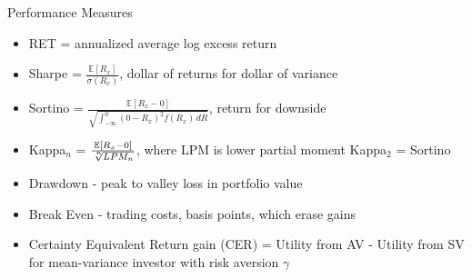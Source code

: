 \documentclass{beamer}
\begin{document}
\begin{frame}{Performance Measures}
	\begin{itemize}[<+->]
		\item RET = annualized average log excess return
		\item Sharpe = $\frac{\mathbb{E}[R_{x}]}{\sigma(R_{x})}$, dollar of returns for dollar of variance
		\item Sortino = $\frac{\mathbb{E}[R_{x} - 0]}{\sqrt  {\int _{{-\infty }}^{0}(0-R_{x})^{2}f(R_{x})\,dR}}$, return for downside
		\item Kappa$_{n}$ = $\frac{\mathbb{E}[R_{x} - 0]}{\sqrt[\leftroot{-2}\uproot{2}n]{LPM_{n}}}$, where LPM is lower partial moment Kappa$_{2}$ = Sortino
		\item Drawdown - peak to valley loss in portfolio value
		\item Break Even - trading costs, basis points, which erase gains
		\item Certainty Equivalent Return gain (CER) = Utility from AV - Utility from SV for mean-variance investor with risk aversion $\gamma$
	\end{itemize}
\end{frame}

%		
\end{document}
